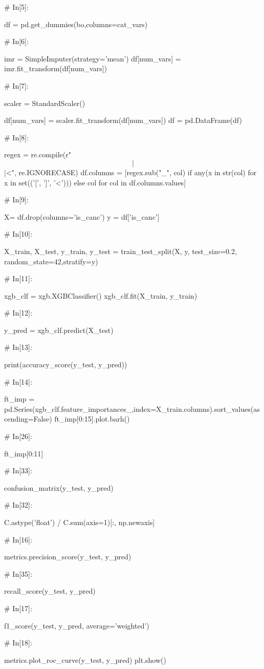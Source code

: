 \begin{python}
# In[5]:


df = pd.get_dummies(bo,columns=cat_vars)


# In[6]:


imr = SimpleImputer(strategy='mean')
df[num_vars] = imr.fit_transform(df[num_vars])


# In[7]:


scaler = StandardScaler()

df[num_vars] = scaler.fit_transform(df[num_vars])
df = pd.DataFrame(df)


# In[8]:


regex = re.compile(r"\[|\]|<", re.IGNORECASE)
df.columns = [regex.sub("_", col) if any(x in str(col) for x in set(('[', ']', '<'))) else col for col in df.columns.values]


# In[9]:


X= df.drop(columns='is_canc')
y = df['is_canc']


# In[10]:


X_train, X_test, y_train, y_test = train_test_split(X, y, test_size=0.2, random_state=42,stratify=y)


# In[11]:


xgb_clf = xgb.XGBClassifier()
xgb_clf.fit(X_train, y_train)


# In[12]:


y_pred = xgb_clf.predict(X_test)


# In[13]:


print(accuracy_score(y_test, y_pred))


# In[14]:


ft_imp = pd.Series(xgb_clf.feature_importances_,index=X_train.columns).sort_values(ascending=False)
ft_imp[0:15].plot.barh()


# In[26]:


ft_imp[0:11]


# In[33]:


confusion_matrix(y_test, y_pred)


# In[32]:


C.astype('float') / C.sum(axis=1)[:, np.newaxis]


# In[16]:


metrics.precision_score(y_test, y_pred)


# In[35]:


recall_score(y_test, y_pred)


# In[17]:


f1_score(y_test, y_pred, average='weighted')


# In[18]:


metrics.plot_roc_curve(y_test, y_pred)  
plt.show()     
\end{python}
